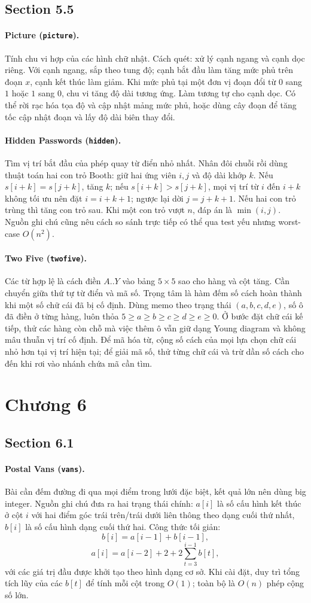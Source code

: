 \documentclass[11pt]{article}
\newcommand{\problem}[2]{\paragraph{#1 (\texttt{#2}).}}
\newcommand{\bigO}[1]{\ensuremath{O(#1)}}
\begin{document}
\subsection*{Section 5.5}

\problem{Picture}{picture}
Tính chu vi hợp của các hình chữ nhật. Cách quét: xử lý cạnh ngang và cạnh dọc riêng. Với cạnh ngang, sắp theo tung độ; cạnh bắt đầu làm tăng mức phủ trên đoạn \(x\), cạnh kết thúc làm giảm. Khi mức phủ tại một đơn vị đoạn đổi từ \(0\) sang \(1\) hoặc \(1\) sang \(0\), chu vi tăng độ dài tương ứng. Làm tương tự cho cạnh dọc. Có thể rời rạc hóa tọa độ và cập nhật mảng mức phủ, hoặc dùng cây đoạn để tăng tốc cập nhật đoạn và lấy độ dài biên thay đổi.

\problem{Hidden Passwords}{hidden}
Tìm vị trí bắt đầu của phép quay từ điển nhỏ nhất. Nhân đôi chuỗi rồi dùng thuật toán hai con trỏ Booth: giữ hai ứng viên \(i,j\) và độ dài khớp \(k\). Nếu \(s[i+k]=s[j+k]\), tăng \(k\); nếu \(s[i+k]>s[j+k]\), mọi vị trí từ \(i\) đến \(i+k\) không tối ưu nên đặt \(i=i+k+1\); ngược lại dời \(j=j+k+1\). Nếu hai con trỏ trùng thì tăng con trỏ sau. Khi một con trỏ vượt \(n\), đáp án là \(\min(i,j)\). Nguồn ghi chú cũng nêu cách so sánh trực tiếp có thể qua test yếu nhưng worst-case \(\bigO{n^2}\).

\problem{Two Five}{twofive}
Các từ hợp lệ là cách điền \(A..Y\) vào bảng \(5\times5\) sao cho hàng và cột tăng. Cần chuyển giữa thứ tự từ điển và mã số. Trọng tâm là hàm đếm số cách hoàn thành khi một số chữ cái đã bị cố định. Dùng memo theo trạng thái \((a,b,c,d,e)\), số ô đã điền ở từng hàng, luôn thỏa \(5\ge a\ge b\ge c\ge d\ge e\ge0\). Ở bước đặt chữ cái kế tiếp, thử các hàng còn chỗ mà việc thêm ô vẫn giữ dạng Young diagram và không mâu thuẫn vị trí cố định. Để mã hóa từ, cộng số cách của mọi lựa chọn chữ cái nhỏ hơn tại vị trí hiện tại; để giải mã số, thử từng chữ cái và trừ dần số cách cho đến khi rơi vào nhánh chứa mã cần tìm.

\section*{Chương 6}

\subsection*{Section 6.1}

\problem{Postal Vans}{vans}
Bài cần đếm đường đi qua mọi điểm trong lưới đặc biệt, kết quả lớn nên dùng big integer. Nguồn ghi chú đưa ra hai trạng thái chính: \(a[i]\) là số cấu hình kết thúc ở cột \(i\) với hai điểm góc trái trên/trái dưới liên thông theo dạng cuối thứ nhất, \(b[i]\) là số cấu hình dạng cuối thứ hai. Công thức tối giản:
\[
  b[i]=a[i-1]+b[i-1],
\]
\[
  a[i]=a[i-2]+2+2\sum_{t=3}^{i-1} b[t],
\]
với các giá trị đầu được khởi tạo theo hình dạng cơ sở. Khi cài đặt, duy trì tổng tích lũy của các \(b[t]\) để tính mỗi cột trong \(\bigO{1}\); toàn bộ là \(\bigO{n}\) phép cộng số lớn.
\end{document}
